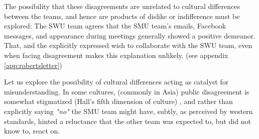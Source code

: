 The possibility that these disagreements are unrelated to cultural differences
between the teams, and hence are products of dislike or indifference must be
explored: The SWU team agrees that the SMU team's emails, Facebook messages,
and appearance during meetings generally showed a positive demeanor. That, and
the explicitly expressed wish to collaborate with the SWU team, even when
facing disagreement makes this explanation unlikely. (see appendix
\ref{app:robertsletter})

Let us explore the possibility of cultural differences acting as catalyst for
misunderstanding. In some cultures, (commonly in Asia) public disagreement is
somewhat stigmatized (Hall's fifth dimension of culture\cite{surprises})
\cite{herbsiemens}, and rather than explicitly saying \emph{"no"} the SMU team
might have, subtly, as perceived by western standards, hinted a reluctance that
the other team was expected to, but did not know to, react on.

